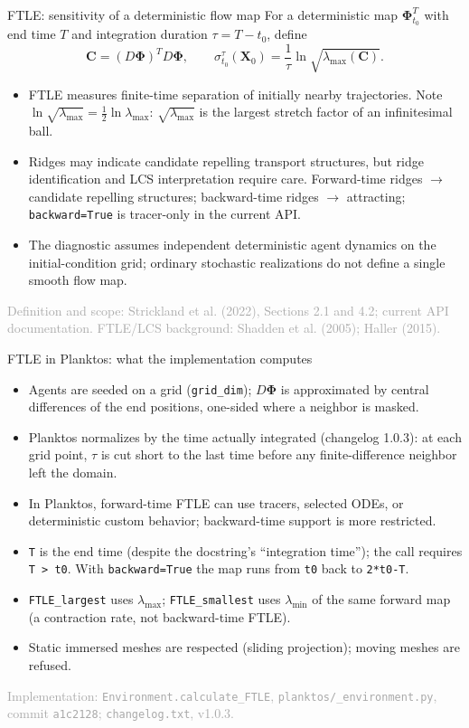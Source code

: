 \documentclass[aspectratio=169,11pt]{beamer}
\newcommand{\XX}{\bm{X}}
\newcommand{\sourcecredit}[1]{\vfill\hfill{\tiny\textcolor{DarkGray}{#1}}}
\newcommand{\code}[1]{\texttt{#1}}
\begin{document}
\begin{frame}{FTLE: sensitivity of a deterministic flow map}
For a deterministic map $\bm\Phi_{t_0}^{T}$ with end time $T$ and integration duration $\tau=T-t_0$, define
\[
  \bm C=(D\bm\Phi)^T D\bm\Phi,
  \qquad
  \sigma_{t_0}^{\tau}(\XX_0)=\frac{1}{\tau}\ln\sqrt{\lambda_{\max}(\bm C)}.
\]
\begin{itemize}
  \item FTLE measures finite-time separation of initially nearby trajectories. Note $\ln\sqrt{\lambda_{\max}}=\tfrac12\ln\lambda_{\max}$: $\sqrt{\lambda_{\max}}$ is the largest stretch factor of an infinitesimal ball.
  \item Ridges may indicate candidate repelling transport structures, but ridge identification and LCS interpretation require care. Forward-time ridges $\rightarrow$ candidate repelling structures; backward-time ridges $\rightarrow$ attracting; \code{backward=True} is tracer-only in the current API.
  \item The diagnostic assumes independent deterministic agent dynamics on the initial-condition grid; ordinary stochastic realizations do not define a single smooth flow map.
\end{itemize}
\sourcecredit{Definition and scope: Strickland et al. (2022), Sections 2.1 and 4.2; current API documentation. FTLE/LCS background: Shadden et al. (2005); Haller (2015).}
\end{frame}

\begin{frame}{FTLE in Planktos: what the implementation computes}
\begin{itemize}
  \item Agents are seeded on a grid (\code{grid\_dim}); $D\bm\Phi$ is approximated by central differences of the end positions, one-sided where a neighbor is masked.
  \item Planktos normalizes by the time actually integrated (changelog 1.0.3): at each grid point, $\tau$ is cut short to the last time before any finite-difference neighbor left the domain.
  \item In Planktos, forward-time FTLE can use tracers, selected ODEs, or deterministic custom behavior; backward-time support is more restricted.
  \item \code{T} is the end time (despite the docstring's ``integration time''); the call requires \code{T > t0}. With \code{backward=True} the map runs from \code{t0} back to \code{2*t0-T}.
  \item \code{FTLE\_largest} uses $\lambda_{\max}$; \code{FTLE\_smallest} uses $\lambda_{\min}$ of the same forward map (a contraction rate, not backward-time FTLE).
  \item Static immersed meshes are respected (sliding projection); moving meshes are refused.
\end{itemize}
\sourcecredit{Implementation: \code{Environment.calculate\_FTLE}, \code{planktos/\_environment.py}, commit \code{a1c2128}; \code{changelog.txt}, v1.0.3.}
\end{frame}
\end{document}
